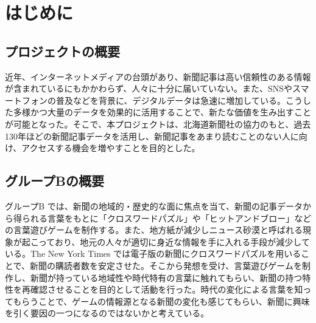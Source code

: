 \chapter{はじめに}

\section{プロジェクトの概要}
近年、インターネットメディアの台頭があり、新聞記事は高い信頼性のある情報が含まれているにもかかわらず、人々に十分に届いていない。また、SNSやスマートフォンの普及などを背景に、デジタルデータは急速に増加している。こうした多様かつ大量のデータを効果的に活用することで、新たな価値を生み出すことが可能となった。そこで、本プロジェクトは、北海道新聞社の協力のもと、過去130年ほどの新聞記事データを活用し、新聞記事をあまり読むことのない人に向け、アクセスする機会を増やすことを目的とした。

\section{グループBの概要}
グループB では、新聞の地域的・歴史的な面に焦点を当て、新聞の記事データから得られる言葉をもとに「クロスワードパズル」や「ヒットアンドブロー」などの言葉遊びゲームを制作する。また、地方紙が減少しニュース砂漠と呼ばれる現象が起こっており、地元の人々が適切に身近な情報を手に入れる手段が減少している。The New York Times では電子版の新聞にクロスワードパズルを用いることで、新聞の購読者数を安定させた。そこから発想を受け、言葉遊びゲームを制作し、新聞が持っている地域性や時代特有の言葉に触れてもらい、新聞の持つ特性を再確認させることを目的として活動を行った。時代の変化による言葉を知ってもらうことで、ゲームの情報源となる新聞の変化も感じてもらい、新聞に興味を引く要因の一つになるのではないかと考えている。
